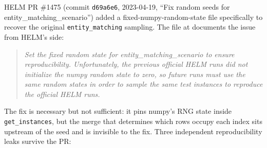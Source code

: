 \documentclass[11pt]{article}
\begin{document}
HELM PR \#1475 (commit \texttt{d69a6e6}, 2023-04-19, ``Fix random
  seeds for entity\_matching\_scenario'') added a fixed-numpy-random-state
  file specifically to recover the original \texttt{entity\_matching}
  sampling.
The file at
  documents the issue from HELM's side:

\begin{quote}\itshape
Set the fixed random state for entity\_matching\_scenario to ensure
  reproducibility.
Unfortunately, the previous official HELM runs did not initialize the
  numpy random state to zero, so future runs must use the same random
  states in order to sample the same test instances to reproduce the
  official HELM runs.
\end{quote}

The fix is necessary but not sufficient: it pins numpy's RNG state
  inside \texttt{get\_instances}, but the merge that determines which
  rows occupy each index sits upstream of the seed and is invisible
  to the fix.
Three independent reproducibility leaks survive the PR:
\end{document}
